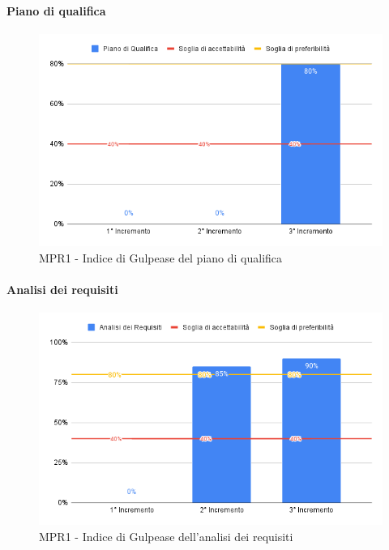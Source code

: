\paragraph{Piano di qualifica} \aCapo{}

\begin{figure}[H]
	\centering
	\includegraphics[scale = 0.6]{sezioni/Images/PdQ.png}
	\caption{MPR1 - Indice di Gulpease del piano di qualifica}
\end{figure}

\paragraph{Analisi dei requisiti} \aCapo{}

\begin{figure}[H]
	\centering
	\includegraphics[scale = 0.6]{sezioni/Images/AdR.png}
	\caption{MPR1 - Indice di Gulpease dell'analisi dei requisiti}
\end{figure}

